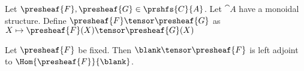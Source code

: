 \begin{definition}
Let $\presheaf{F},\presheaf{G}\in \prshfs{C}{A}$. Let $\cat{A}$ have a monoidal structure.
Define $\presheaf{F}\tensor \presheaf{G}$ as $X \mapsto \presheaf{F}(X) \tensor \presheaf{G}(X)$
\end{definition}

\begin{lemma}
Let $\presheaf{F}$ be fixed. Then $\blank \tensor \presheaf{F}$ is left adjoint to $\Hom{\presheaf{F}}{\blank}$.
\end{lemma}




